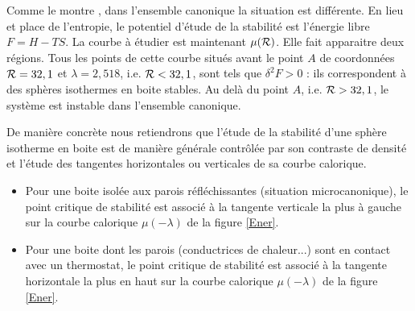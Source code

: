 	Comme le montre \cite{2002A&A...381..340C}, dans l'ensemble canonique la situation est différente. En lieu et place de l'entropie, le potentiel d'étude de la stabilité est l'énergie libre $F=H-TS$. La courbe à étudier est maintenant $\mu(\mathcal{R})$. Elle fait apparaitre deux régions. Tous les points de cette courbe situés avant le point $A$ de coordonnées $\mathcal{R}=32,1$ et $\lambda=2,518$, i.e. $\mathcal{R}<32,1$, sont tels que $\delta^2 F>0$ : ils correspondent à des sphères isothermes en boite stables. Au delà du point $A$, i.e. $\mathcal{R}>32,1$, le système est instable dans l'ensemble canonique.
	
	De manière concrète nous retiendrons que l'étude de la stabilité d'une sphère isotherme en boite est de manière générale contrôlée par son contraste de densité et l'étude des tangentes horizontales ou verticales de sa courbe calorique.   
	\begin{itemize}
	\item Pour une boite isolée aux parois réfléchissantes (situation microcanonique), le point critique de stabilité est associé à la tangente verticale la plus à gauche sur la courbe calorique $\mu(-\lambda)$ de la figure \ref{Ener}.
	\item Pour une boite dont les parois (conductrices de chaleur...) sont en contact avec un thermostat, le point critique de stabilité est associé à la tangente horizontale la plus en haut sur la courbe calorique $\mu(-\lambda)$ de la figure \ref{Ener}.
\end{itemize}
	